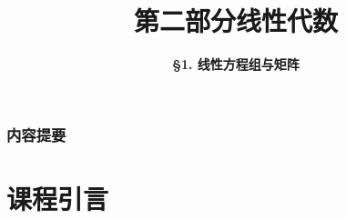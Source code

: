 


\usepackage{kbordermatrix}


\title[Linear Algebra]{\LARGE \bfseries 第二部分\quad 线性代数} %
\author[Linear Equations and Matrix] %
{\Large \bfseries \S 1. 线性方程组与矩阵}
\date{}





\begin{frame}

\titlepage %

\end{frame}


\begin{frame}
\frametitle{内容提要} %
\tableofcontents %
\end{frame}


\section{课程引言} %


